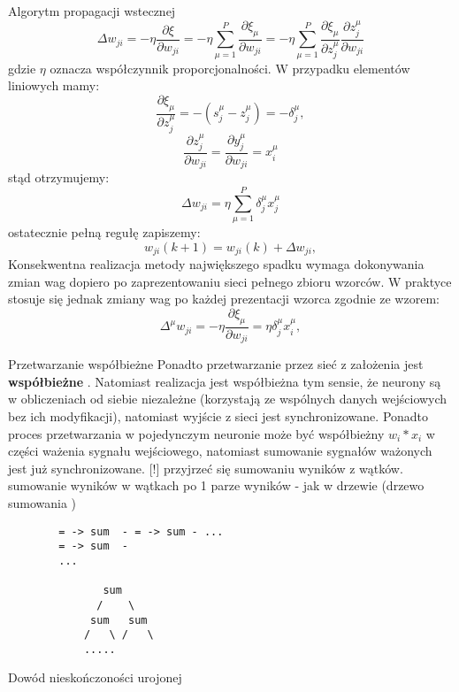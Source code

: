 \begin{easyappendix}{Algorytm propagacji wstecznej}
\begin{equation}
       \Delta w_{ji} = -\eta \frac{\partial\xi}{\partial w_{ji}} = -\eta \sum ^{P}_{\mu=1} \frac {\partial \xi_\mu}{\partial w_{ji}} = -\eta \sum ^{P}_{\mu=1} \frac {\partial \xi_\mu}{\partial z^\mu_j} \frac{\partial z_j^\mu}{\partial w_{ji}}
\end{equation}
gdzie \(\eta\) oznacza współczynnik proporcjonalności.
W przypadku elementów liniowych mamy:
\begin{equation}
       \frac{\partial\xi_\mu}{\partial z^\mu_j} = -(s^\mu_j-z^\mu_j) = -\delta^\mu_j, 
\end{equation}
\begin{equation}
       \frac{\partial z_j^\mu}{\partial w_{ji}} = \frac{\partial y^\mu_j}{\partial w_{ji} } = x _i^\mu
\end{equation}
stąd otrzymujemy:
\begin{equation}
       \Delta w_{ji} = \eta \sum_{\mu=1}^{P} \delta^\mu_j x^\mu_j
\end{equation}
ostatecznie pełną regułę zapiszemy:
\begin{equation}
       w_{ji}(k+1)  = w_{ji}(k) + \Delta w_{ji},
\end{equation}
Konsekwentna realizacja metody największego spadku wymaga dokonywania zmian wag dopiero po zaprezentowaniu sieci pełnego zbioru wzorców. W praktyce stosuje się jednak zmiany wag po każdej prezentacji wzorca zgodnie ze wzorem:
\begin{equation}
       \Delta ^\mu w_{ji} = -\eta \frac {\partial \xi _\mu}{\partial w_{ji}} = \eta \delta _j ^\mu x^\mu_i,
\end{equation}

\end{easyappendix}


\begin{easyappendix}{Przetwarzanie współbieżne}
 Ponadto przetwarzanie przez sieć z założenia jest \textbf{współbieżne} \cite{ossowski2020}. Natomiast realizacja jest współbieżna tym sensie, że neurony są w obliczeniach od siebie niezależne (korzystają ze wspólnych danych wejściowych bez ich modyfikacji), natomiast wyjście z sieci jest synchronizowane. Ponadto proces przetwarzania w pojedynczym neuronie może być współbieżny \( w_i*x_i \) w części ważenia sygnału wejściowego, natomiast sumowanie sygnałów ważonych jest już synchronizowane.
[!]
\newline  
przyjrzeć się sumowaniu wyników z wątków.
sumowanie wyników w wątkach po 1 parze wyników - jak w drzewie (drzewo sumowania )
\begin{lstlisting}
        = -> sum  - = -> sum - ... 
        = -> sum  -
        ...

               sum
              /    \
             sum   sum
            /   \ /   \ 
            ..... 
\end{lstlisting}    
\end{easyappendix}

\begin{easyappendix}{Dowód nieskończoności urojonej}
\lipsum[8]
\end{easyappendix}
